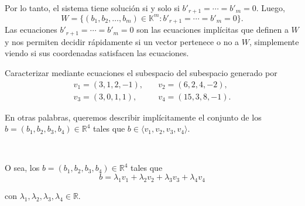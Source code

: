\documentclass[handout]{beamer} %
\newcommand{\R}{\mathbb R}
\newcommand{\K}{\mathbb K}
\begin{document}
\begin{frame}
    Por lo tanto, el sistema tiene solución si y solo si  $b'_{r+1} = \cdots = b'_m =0$. Luego, 
    \begin{equation*}
        W = \{(b_1,b_2, \ldots,b_m) \in \K^m: b'_{r+1} = \cdots = b'_m =0\}.
    \end{equation*}
    Las ecuaciones $ b'_{r+1} = \cdots = b'_m =0$ son las ecuaciones implícitas que definen a $W$ y nos permiten decidir rápidamente si un vector pertenece o no a $W$, simplemente viendo si sus coordenadas satisfacen las ecuaciones.

\end{frame}

\begin{frame}
    \begin{ejemplo}
        Caracterizar mediante ecuaciones el subespacio del subespacio generado por 
        \begin{align*}
            v_1=(3,1,2,-1),&\quad
            v_2=(6,2,4,-2),\\
            v_3=(3,0,1,1),&\quad
            v_4=(15,3,8,-1).
            \end{align*}
    \end{ejemplo}

    \pause
    
    \begin{solucion}
        

    
    En otras palabras, queremos describir implícitamente el conjunto de los $b=(b_1,b_2,b_3,b_4)
    \in\R^4$ tales que $b\in\langle v_1, v_2, v_3, v_4\rangle$.
    
    \

    \pause
    O sea, los $b=(b_1,b_2,b_3,b_4)
    \in\R^4$ tales que 
    \begin{equation*}
        b=\lambda_1v_1+\lambda_2v_2+\lambda_3v_3+\lambda_4v_4 \tag{*}
    \end{equation*}
    
    
    con $\lambda_1,\lambda_2,\lambda_3,\lambda_4\in\R$.

    \end{solucion}

    \end{frame}
    
\end{document}
